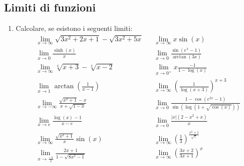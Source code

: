 \subsection{Limiti di funzioni}
\begin{enumerate}
	\item Calcolare, se esistono i seguenti limiti:
	      \begin{align*}
		       & \lim_{x \to \infty} \sqrt{3x^2  + 2x + 1} - \sqrt{ 3x^2  +5x}                                       &  & \lim_{x \to \infty} x \sin \left(x\right)                                                                               \\
		       & \lim_{x \to 0} \frac{\sinh \left(x\right)}{x}                                                       &  & \lim_{x \to 0} \frac{\sin \left(e^{x} -1\right)}{\arctan\left(3x\right)}                                                \\
		       & \lim_{x \to \infty} \sqrt[4]{x + 3} - \sqrt[4]{x -2}                                                &  & \lim_{x \to 0^{+}} x \frac{-1}{1 - \log \left(x\right)}                                                                 \\
		       & \lim_{x \to 1} \arctan \left(\frac{1}{x-1}\right)                                                   &  & \lim_{x \to \infty} \left(\frac{1}{\log \left(x+3\right)}\right)^{x+3}                                                  \\
		       & \lim_{x \to -\infty } \frac{\sqrt{x^2  +1} -x}{x + \sqrt{ 1 -x}}                                    &  & \lim_{x \to 0} \frac{1- \cos \left(e^{2x }-1\right)}{\sin \left(\log \left(1+\sqrt{\cos \left(x \right)}\right)\right)} \\
		       & \lim_{x \to e} \frac{\log \left(x\right) -1}{x-e}                                                   &  & \lim_{x \to 0}  \frac{\left|x\right|\left(2 - x^2 +x\right)}{x}                                                         \\
		       & \lim_{x \to \infty} \frac{\sqrt{x^2 +1}}{x} \sin \left(x\right)                                     &  & \lim_{x \to \infty} \left(\frac{1}{3}\right)^{\frac{x^2  + 1}{\sqrt{x}}}                                                \\
		       & \lim_{x \to \frac{-1}{2}} \frac{2x + 1}{1 - \sqrt{8x^2  -1}}                                        &  & \lim_{x \to \infty} \left(\frac{3x + 2}{3x + 1}\right)^{x}                                                              \\

\end{align*}
\end{enumerate}
